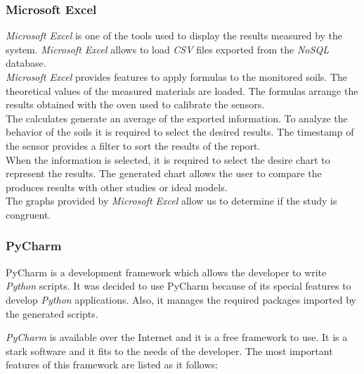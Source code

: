 \subsubsection{Microsoft Excel}

\textit{Microsoft Excel} is one of the tools used to display the results measured by the system. \textit{Microsoft Excel} allows to load \textit{CSV} files exported from the \textit{NoSQL} database.\\

\textit{Microsoft Excel} provides features to apply formulas to the monitored soils. The theoretical values of the measured materials are loaded. The formulas arrange the results obtained with the oven used to calibrate the sensors.\\

The calculates generate an average of the exported information. To analyze the behavior of the soils it is required to select the desired results. The timestamp of the sensor provides a filter to sort the results of the report.\\

When the information is selected, it is required to select the desire chart to represent the results. The generated chart allows the user to compare the produces results with other studies or ideal models.\\

The graphs provided by \textit{Microsoft Excel} allow us to determine if the study is congruent.

\subsubsection{PyCharm}

PyCharm is a development framework which allows the developer to write \textit{Python} scripts. It was decided to use PyCharm because of its special features to develop \textit{Python} applications. Also, it manages the required packages imported by the generated scripts.

\textit{PyCharm} is available over the Internet and it is a free framework to use. It is a stark software and it fits to the needs of the developer. The most important features of this framework are listed as it follows:

